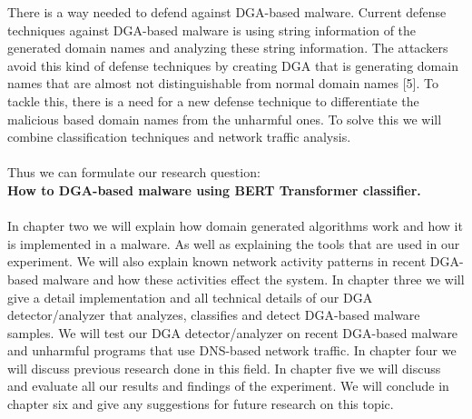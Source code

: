 There is a way needed to defend against DGA-based malware. Current defense techniques against DGA-based malware is using string information of the generated domain names and analyzing these string information. The attackers avoid this kind of defense techniques by creating DGA that is generating domain names that are almost not distinguishable from normal domain names [5]. To tackle this, there is a need for a new defense technique to differentiate the malicious based domain names from the unharmful ones. To solve this we will combine classification techniques and network traffic analysis.\\\\
Thus we can formulate our research question:\\ \textbf{How to DGA-based malware using BERT Transformer classifier.}\\\\
In chapter two we will explain how domain generated algorithms work and how it is implemented in a malware. As well as explaining the tools that are used in our experiment. We will also explain known network activity patterns in recent DGA-based malware and how these activities effect the system.
In chapter three we will give a detail implementation and all technical details of our DGA detector/analyzer that analyzes, classifies and detect DGA-based malware samples. We will test our DGA detector/analyzer on recent DGA-based malware and unharmful programs that use DNS-based network traffic.
In chapter four we will discuss previous research done in this field.
In chapter five we will discuss and evaluate all our results and findings of the experiment.
We will conclude in chapter six and give any suggestions for future research on this topic.

